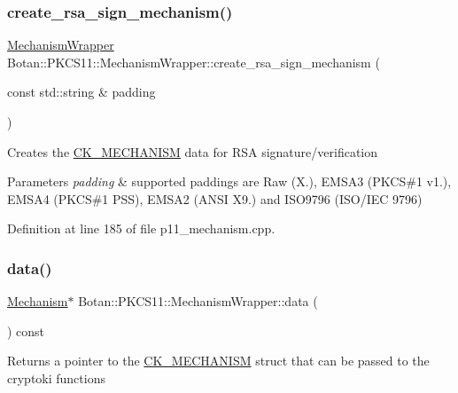 \subsubsection{\texorpdfstring{create\+\_\+rsa\+\_\+sign\+\_\+mechanism()}{create\_rsa\_sign\_mechanism()}}
{\footnotesize\ttfamily \mbox{\hyperlink{class_botan_1_1_p_k_c_s11_1_1_mechanism_wrapper}{Mechanism\+Wrapper}} Botan\+::\+P\+K\+C\+S11\+::\+Mechanism\+Wrapper\+::create\+\_\+rsa\+\_\+sign\+\_\+mechanism (\begin{DoxyParamCaption}\item[{const std\+::string \&}]{padding }\end{DoxyParamCaption})\hspace{0.3cm}{\ttfamily [static]}}

Creates the \mbox{\hyperlink{struct_c_k___m_e_c_h_a_n_i_s_m}{C\+K\+\_\+\+M\+E\+C\+H\+A\+N\+I\+SM}} data for R\+SA signature/verification 
\begin{DoxyParams}{Parameters}
{\em padding} & supported paddings are Raw (X.), E\+M\+S\+A3 (P\+K\+CS\#1 v1.), E\+M\+S\+A4 (P\+K\+CS\#1 P\+SS), E\+M\+S\+A2 (A\+N\+SI X9.) and I\+S\+O9796 (I\+S\+O/\+I\+EC 9796) \\
\hline
\end{DoxyParams}


Definition at line 185 of file p11\+\_\+mechanism.\+cpp.

\mbox{\label{class_botan_1_1_p_k_c_s11_1_1_mechanism_wrapper_a9207102ddf27379a3cdf0331e65feb9d}} 
\subsubsection{\texorpdfstring{data()}{data()}}
{\footnotesize\ttfamily \mbox{\hyperlink{struct_c_k___m_e_c_h_a_n_i_s_m}{Mechanism}}$\ast$ Botan\+::\+P\+K\+C\+S11\+::\+Mechanism\+Wrapper\+::data (\begin{DoxyParamCaption}{ }\end{DoxyParamCaption}) const\hspace{0.3cm}{\ttfamily [inline]}}

\begin{DoxyReturn}{Returns}
a pointer to the \mbox{\hyperlink{struct_c_k___m_e_c_h_a_n_i_s_m}{C\+K\+\_\+\+M\+E\+C\+H\+A\+N\+I\+SM}} struct that can be passed to the cryptoki functions 
\end{DoxyReturn}


